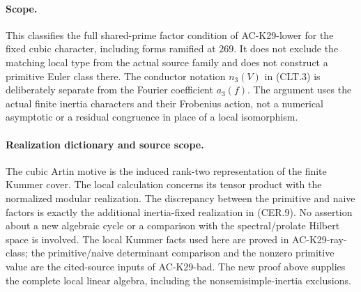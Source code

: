 \paragraph{Scope.}
This classifies the full shared-prime factor condition of
AC-K29-lower for the fixed cubic character, including
forms ramified at $269$.  It does not exclude the matching
local type from the actual source family and does not
construct a primitive Euler class there.
The conductor notation $n_3(V)$ in (CLT.3) is deliberately
separate from the Fourier coefficient $a_3(f)$.
The argument uses the actual finite inertia characters
and their Frobenius action, not a numerical asymptotic
or a residual congruence in place of a local isomorphism.

\paragraph{Realization dictionary and source scope.}
The cubic Artin motive is the induced rank-two representation
of the finite Kummer cover.  The local calculation concerns
its tensor product with the normalized modular realization.
The discrepancy between the primitive and naive factors is
exactly the additional inertia-fixed realization in (CER.9).
No assertion about a new algebraic cycle or a comparison with
the spectral/prolate Hilbert space is involved.  The local
Kummer facts used here are proved in AC-K29-ray-class; the
primitive/naive determinant comparison and the nonzero
primitive value are the cited-source inputs of AC-K29-bad.
The new proof above supplies the complete local linear
algebra, including the nonsemisimple-inertia exclusions.
